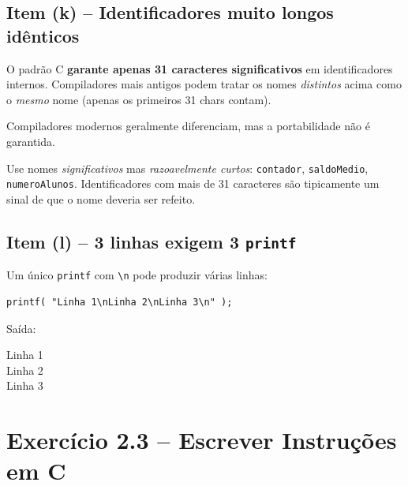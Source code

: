 \documentclass[12pt,a4paper]{article}
\begin{document}
\subsection*{Item (k) -- Identificadores muito longos idênticos}
\begin{tcolorbox}[colback=red!5,colframe=deitelred,title={\bfseries FALSO}]
O padrão C \textbf{garante apenas 31 caracteres significativos} em identificadores
internos. Compiladores mais antigos podem tratar os nomes \textit{distintos} acima
como o \textit{mesmo} nome (apenas os primeiros 31 chars contam).

Compiladores modernos geralmente diferenciam, mas a portabilidade não é garantida.

\begin{boaprática}
  Use nomes \textit{significativos} mas \textit{razoavelmente curtos}: \texttt{contador},
  \texttt{saldoMedio}, \texttt{numeroAlunos}. Identificadores com mais de 31 caracteres
  são tipicamente um sinal de que o nome deveria ser refeito.
\end{boaprática}
\end{tcolorbox}

\subsection*{Item (l) -- 3 linhas exigem 3 \texttt{printf}}
\begin{tcolorbox}[colback=red!5,colframe=deitelred,title={\bfseries FALSO}]
Um único \texttt{printf} com \texttt{\textbackslash n} pode produzir várias linhas:
\begin{lstlisting}
printf( "Linha 1\nLinha 2\nLinha 3\n" );
\end{lstlisting}
Saída:
\begin{saida}
Linha 1\\Linha 2\\Linha 3
\end{saida}
\end{tcolorbox}

\newpage

\section{Exercício 2.3 -- Escrever Instruções em C}
\end{document}
